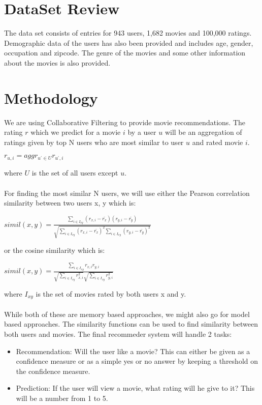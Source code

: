 \documentclass[pdftex,12pt,a4paper]{article}
\begin{document}
	\section{DataSet Review}
		The data set consists of entries for 943 users, 1,682 movies and 100,000 ratings. Demographic data of the users has also been provided and includes age, gender, occupation and zipcode. The genre of the movies and some other information about the movies is also provided.
	
	\section{Methodology}
		We are using Collaborative Filtering to provide movie recommendations. The rating $r$ which we predict for a movie $i$ by a user $u$ will be an aggregation of ratings given by top N users who are most similar to user $u$ and rated movie $i$.
		\begin{center}
			$r_{u,i} = aggr_{u^\prime \in U} r_{u^\prime, i}$
		\end{center}
		where $U$ is the set of all users except $u$.\\\\
		For finding the most similar N users, we will use either the Pearson correlation similarity between two users x, y which is:
		\begin{center}
			$simil(x,y) = \frac{\sum\limits_{i \in I_{xy}}(r_{x,i}-\bar{r_x})(r_{y,i}-\bar{r_y})}{\sqrt{\sum\limits_{i \in I_{xy}}(r_{x,i}-\bar{r_x})^2\sum\limits_{i \in I_{xy}}(r_{y,i}-\bar{r_y})^2}}$
		\end{center}
		or the cosine similarity which is:
		\begin{center}
			$simil(x,y) = \frac{\sum\limits_{i \in I_{xy}}r_{x,i}r_{y,i}}{\sqrt{\sum\limits_{i \in I_{xy}}r_{x,i}^2}\sqrt{\sum\limits_{i \in I_{xy}}r_{y,i}^2}}$
		\end{center}
		where $I_{xy}$ is the set of movies rated by both users x and y.\\\\
		While both of these are memory based approaches, we might also go for model based approaches. The similarity functions can be used to find similarity between both users and movies. The final recommeder system will handle 2 tasks:
		\begin{itemize}
			\item Recommendation: Will the user like a movie? This can either be given as a confidence measure or as a simple yes or no answer by keeping a threshold on the confidence measure.
			\item Prediction: If the user will view a movie, what rating will he give to it? This will be a number from 1 to 5.
		\end{itemize}

	
	
\end{document}
